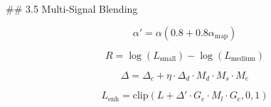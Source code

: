 ## 3.5 Multi-Signal Blending

$$
\alpha' = \alpha (0.8 + 0.8 \alpha_{\text{map}}) \tag{18}
$$

$$
R = \log(L_{\text{small}}) - \log(L_{\text{medium}}) \tag{19}
$$

$$
\Delta = \Delta_c + \eta \cdot \Delta_d \cdot M_d \cdot M_s \cdot M_e \tag{20}
$$

$$
L_{\text{enh}} = \mathrm{clip}(L + \Delta' \cdot G_e \cdot M_l \cdot G_c, 0, 1) \tag{21}
$$